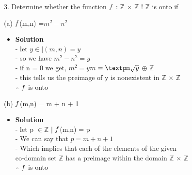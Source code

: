 \documentclass[11pt]{article}
\begin{document}
\begin{enumerate}

\begin{flushleft}
{\large 3. Determine whether the function $\mathnormal{f}$ : $\mathbb{Z}$ × $\mathbb{Z}$ ! $\mathbb{Z}$ is onto if}\\
\end{flushleft}



\large (a) $\mathnormal{f}$(m,n) =$m^2-n^2$\\

\begin{itemize}
\item \textbf{Solution}\\
\large - let $y \in $$\mid$$(m,n) = y$\\
\large - so we have $m^2-n^2=y$\\
\large - if n = 0 we get, $m^2 = y $\longrightarrow $ m = \textpm \sqrt{y}$ $\oplus$ $\mathbb{Z}$\\
\large - this tells us the preimage of y is nonexistent in $\mathbb{Z}$ × $\mathbb{Z}$\\
\large $\therefore$ $\mathnormal{f}$ is onto\\


\end {itemize}
\end {enumerate}

\begin{enumerate}

\begin{flushleft}
\end{flushleft}


\large (b) $\mathnormal{f}$(m,n) = m + n + 1\\

\begin{itemize}
\item \textbf{Solution}\\
\large - let p $\in \mathbb{ Z }$ $\mid$ $\mathnormal{f}$(m,n) = p\\
\large - We can say that $p = m + n + 1$ \\
\large - Which implies that each of the elements of the given\\
\large co-domain set $\mathbb{ Z }$ has a preimage within the domain $\mathbb{Z}$ × $\mathbb{Z}$\\
\large $\therefore$ $\mathnormal{f}$ is onto\\


\end {itemize}
\end {enumerate}
\end{document}
